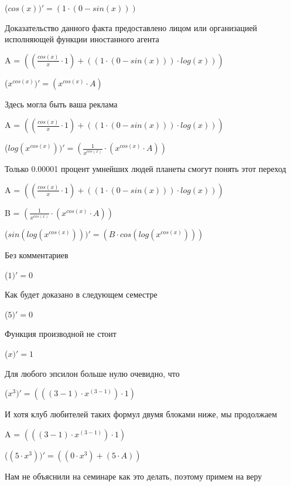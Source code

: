 \documentclass[12pt,a4paper,fleqn]{article}
\begin{document}
\begin{center}
 ($cos(x))'
  = (1 \cdot (0-sin(x)))$\end{center}
Доказательство данного факта предоставлено лицом или организацией исполняющей функции иностанного агента

\begin{center}
A = $((\frac{cos(x)}{x} \cdot 1)+((1 \cdot (0-sin(x))) \cdot log(x)))$\end{center}
\begin{center}
 ($x^{cos(x)})'
  = (x^{cos(x)} \cdot A)$\end{center}
Здесь могла быть ваша реклама

\begin{center}
A = $((\frac{cos(x)}{x} \cdot 1)+((1 \cdot (0-sin(x))) \cdot log(x)))$\end{center}
\begin{center}
 ($log(x^{cos(x)}))'
  = (\frac{1}{x^{cos(x)}} \cdot (x^{cos(x)} \cdot A))$\end{center}
Только 0.00001 процент умнейших людей планеты смогут понять этот переход

\begin{center}
A = $((\frac{cos(x)}{x} \cdot 1)+((1 \cdot (0-sin(x))) \cdot log(x)))$\end{center}
\begin{center}
B = $(\frac{1}{x^{cos(x)}} \cdot (x^{cos(x)} \cdot A))$\end{center}
\begin{center}
 ($sin(log(x^{cos(x)})))'
  = (B \cdot cos(log(x^{cos(x)})))$\end{center}
Без комментариев

\begin{center}
 ($1)'
  = 0$\end{center}
Как будет доказано в следующем семестре

\begin{center}
 ($5)'
  = 0$\end{center}
Функция производной не стоит

\begin{center}
 ($x)'
  = 1$\end{center}
Для любого эпсилон больше нулю очевидно, что

\begin{center}
 ($x^{3})'
  = (((3-1) \cdot x^{(3-1)}) \cdot 1)$\end{center}
И хотя клуб любителей таких формул двумя блоками ниже, мы продолжаем

\begin{center}
A = $(((3-1) \cdot x^{(3-1)}) \cdot 1)$\end{center}
\begin{center}
 ($(5 \cdot x^{3}))'
  = ((0 \cdot x^{3})+(5 \cdot A))$\end{center}
Нам не объяснили на семинаре как это делать, поэтому примем на веру
\end{document}
